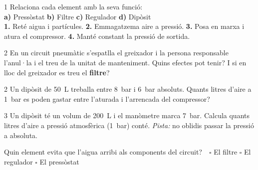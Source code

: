 \begin{exercici}{1}
Relaciona cada element amb la seva funció:\\
\textbf{a)} Pressòstat \quad \textbf{b)} Filtre \quad \textbf{c)} Regulador \quad \textbf{d)} Dipòsit\\
\textbf{1.} Reté aigua i partícules. \quad \textbf{2.} Emmagatzema aire a pressió. \quad \textbf{3.} Posa en marxa i atura el compressor. \quad \textbf{4.} Manté constant la pressió de sortida.
\end{exercici}

\begin{exercici}{2}
En un circuit pneumàtic s'espatlla el greixador i la persona responsable l'anul·la i el treu de la unitat de manteniment. Quins efectes pot tenir? I si en lloc del greixador es treu el \textbf{filtre}?
\end{exercici}

\begin{exercici}{2}
Un dipòsit de \SI{50}{\liter} treballa entre \SI{8}{\bar} i \SI{6}{\bar} absoluts. Quants litres d'aire a \SI{1}{\bar} es poden gastar entre l'aturada i l'arrencada del compressor?
\end{exercici}

\begin{exercici}{3}
Un dipòsit té un volum de \SI{200}{\liter} i el manòmetre marca \SI{7}{\bar}. Calcula quants litres d'aire a pressió atmosfèrica (\SI{1}{\bar}) conté. \emph{Pista:} no oblidis passar la pressió a absoluta.
\end{exercici}

\begin{comprova}
Quin element evita que l'aigua arribi als components del circuit?\ \ $\square$ El filtre \quad $\square$ El regulador \quad $\square$ El pressòstat
\end{comprova}
